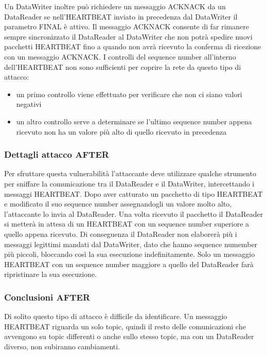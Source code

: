 Un DataWriter inoltre può richiedere un messaggio ACKNACK da un DataReader se
nell'HEARTBEAT inviato in precedenza dal DataWriter il parametro FINAL è attivo.
Il messaggio ACKNACK consente di far rimanere sempre sincronizzato il DataReader al 
DataWriter che non potrà spedire nuovi pacchetti HEARTBEAT fino a quando non avrà 
ricevuto la conferma di ricezione con un messaggio ACKNACK.
I controlli del sequence number all'interno dell'HEARTBEAT 
non sono sufficienti per coprire la rete da questo tipo di attacco:
\begin{itemize}
    \item un primo controllo viene effettuato per verificare che non ci siano 
    valori negativi
    \item un altro controllo serve a determinare se l'ultimo sequence number 
    appena ricevuto non ha un valore più alto di quello ricevuto in precedenza
\end{itemize}\cite{White2017AnII}
\subsubsection{Dettagli attacco AFTER}

Per sfruttare questa vulnerabilità l'attaccante deve utilizzare qualche 
strumento per sniffare la comunicazione tra il DataReader e il DataWriter,
intercettando i
messaggi HEARTBEAT. Dopo aver catturato un pacchetto di tipo HEARTBEAT e modificato 
il suo sequence number assegnandogli un valore molto alto, 
l'attaccante lo invia al DataReader.
Una volta ricevuto il pacchetto il DataReader si metterà in attesa di un HEARTBEAT 
con un
sequence number superiore a quello appena ricevuto. Di conseguenza il DataReader
non elaborerà più i messaggi legittimi mandati dal DataWriter,
dato che hanno sequence numember più piccoli, bloccando così la sua
esecuzione indefinitamente. Solo un messaggio HEARTBEAT con un sequence number
maggiore a quello del DataReader farà ripristinare la sua esecuzione.\cite{White2017AnII}


\subsubsection{Conclusioni AFTER}
Di solito questo tipo di attacco è difficile da identificare. 
Un messaggio HEARTBEAT riguarda un solo topic, quindi il resto delle
comunicazioni che avvengono su topic differenti o anche sullo stesso 
topic, ma con un DataReader diverso, non subiranno cambiamenti.


